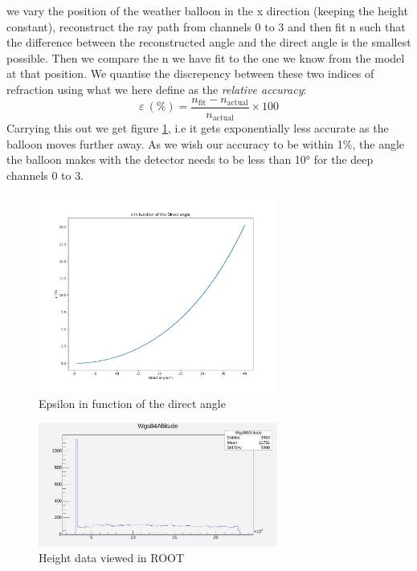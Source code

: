 \documentclass[11pt,a4paper,faculty=we,language=en,doctype=report]{cls/ugent-doc}
\begin{document}
we vary the position of the weather balloon in the x direction (keeping the
height constant), reconstruct the ray path from channels 0 to 3 and then fit n such that the
difference between the reconstructed angle and the direct angle is the smallest
possible.  Then we compare the n we have fit to the one we know from the model
at that position.  We quantise the discrepency between these two indices of
refraction using what we here define as the \textit{relative accuracy}:
\begin{equation}
  \varepsilon\ (\%) = \frac{n_\text{fit} - n_{\text{actual}}}{n_{\text{actual}}} \times 100
\end{equation}
Carrying this out we get figure \ref{fig:EpsilonIFODirect}, i.e it gets
exponentially less accurate as the balloon moves further away. As we wish our
accuracy to be within 1\%, the angle the balloon makes with the detector needs
to be less than 10° for the deep channels 0 to 3.
\begin{figure}
	\centering
	\includegraphics[width=0.7\textwidth]{EpsilonIFODirect.pdf}
	\caption{Epsilon in function of the direct angle}
	\label{fig:EpsilonIFODirect}
\end{figure}
\begin{figure}
  \centering
  \includegraphics[width=0.7\textwidth]{BobsWeatherBalloonHeight.pdf}
  \caption{Height data viewed in ROOT}
  \label{fig:BobsWeatherBalloonHeight}
\end{figure}
\end{document}
